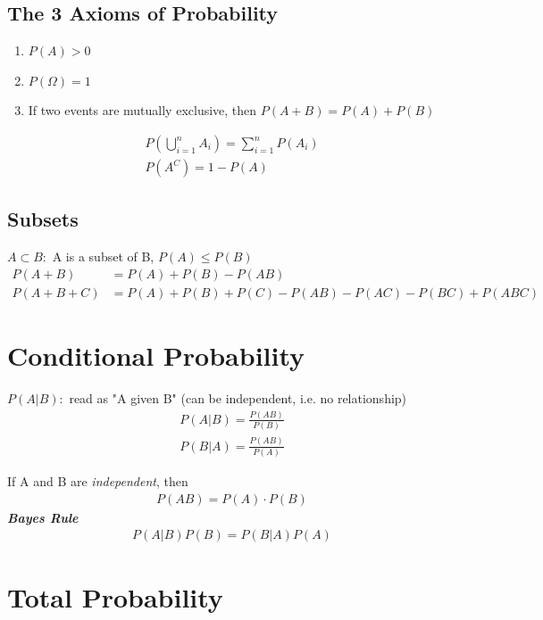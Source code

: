 \documentclass[12pt]{article}
\begin{document}
    \subsection{The 3 Axioms of Probability}

    \begin{enumerate}[label=\Roman*]
        \item $P(A) > 0$
        \item $P(\Omega) = 1$
        \item If two events are mutually exclusive, then
        $ P(A+B) = P(A) + P(B) $
    \end{enumerate}

    \begin{align}
        P\left(\bigcup_{i=1}^{n} A_i\right) = \sum_{i=1}^{n} P(A_i)\\
        P(A^C) = 1 - P(A)
    \end{align}

    \subsection{Subsets}

    $A \subset B:$ A is a subset of B, $P(A) \leq P(B)$
    \begin{align}
        P(A+B) &= P(A) + P(B) - P(AB)\\
        P(A+B+C) &= P(A) + P(B) + P(C) - P(AB) - P(AC) - P(BC) 
        + P(ABC)
    \end{align} 

    \section{Conditional Probability}

    $P(A|B):$ read as "A given B" (can be independent, i.e. no 
    relationship)
    \begin{align}
        P(A|B) = \frac{P(AB)}{P(B)}\\
        P(B|A) = \frac{P(AB)}{P(A)}
    \end{align}

    If A and B are \textit{independent}, then
    \begin{align}
        P(AB) = P(A) \cdot P(B)
    \end{align}
    \textbf{\textit{Bayes Rule}}
    \begin{align}
        P(A|B)P(B) = P(B|A)P(A)
    \end{align}

    \section{Total Probability}
\end{document}

